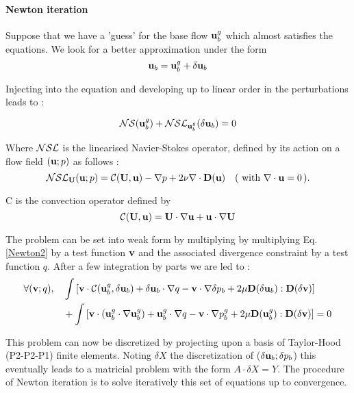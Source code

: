 \documentclass{elsarticle}
\newcommand{\be}[1]{ \begin{equation} \label{#1}}
\newcommand{\ee}{\end{equation}}
\begin{document}


\paragraph{Newton iteration}

Suppose that we have a 'guess' for the base flow ${\bf u}_b^g$ which almost satisfies the equations.  We look for a better approximation under the form
\be{Newton1}
{\bf u}_b = {\bf u}_b^g + \delta {\bf u}_b
\ee

Injecting into the equation and developing up to linear order in the perturbations leads to :

\be{Newton2}
{\cal NS} ({\bf u}_b^g) + {\cal NSL}_{{\bf u}_b^g}( \delta {\bf u}_b)  = 0
\ee

Where ${\cal NSL}$ is the linearised Navier-Stokes operator, defined by its action on a flow field $({\bf u} ; p)$ as follows :
\be{defNSL}
 {\cal NSL}_{{\bf U}}( {\bf u} ;  p) = {\cal C}( {\bf U} , {\bf u}) -\nabla p
+2 \nu \nabla  \cdot {\bf D}({\bf u}) \quad ( \mbox{ with } \nabla \cdot {\bf u } = 0 \, ).
 \ee

{\cal C} is the convection operator defined by 
\be{defC}
{\cal C}( {\bf U} , {\bf u}) = {\bf U} \cdot \nabla {\bf u} + {\bf u} \cdot \nabla {\bf U}
\ee


The problem can be set into weak form by multiplying by multiplying Eq. \ref{Newton2} by a test function ${\bf v}$ and the associated divergence constraint by a test function $q$. After a few integration by parts we are led to :
\begin{eqnarray}
\label{NewtonWeak}
\forall ({\bf v};q), \quad
\displaystyle &\int \left[ {\bf v} \cdot {\cal C}( {\bf u}_b^g , \delta {\bf u}_b) + \delta {\bf u}_b \cdot \nabla q - {\bf v} \cdot \nabla \delta p_b
+ 2 \mu {\bf D}(\delta {\bf u}_b) : {\bf D}(\delta {\bf v}) \right]
\\
\nonumber
\displaystyle & + \int \left[ {\bf v} \cdot ( {\bf u}_b^g \cdot \nabla {\bf u}_b^g) 
+ {\bf u}_b^g \cdot \nabla q 
- {\bf v} \cdot \nabla p_b^g
+ 2 \mu {\bf D}({\bf u}_b^g) : {\bf D}(\delta {\bf v}) \right] = 0 
\end{eqnarray}

This problem can now be discretized by projecting upon a basis of Taylor-Hood (P2-P2-P1) finite elements. Noting $\delta X$ the discretization of ($\delta {\bf u}_b;\delta p_b$) this eventually leads to a matricial problem with the form $A \cdot \delta X = Y$. The procedure of Newton iteration is to solve iteratively this set of equations up to convergence.
\end{document}
